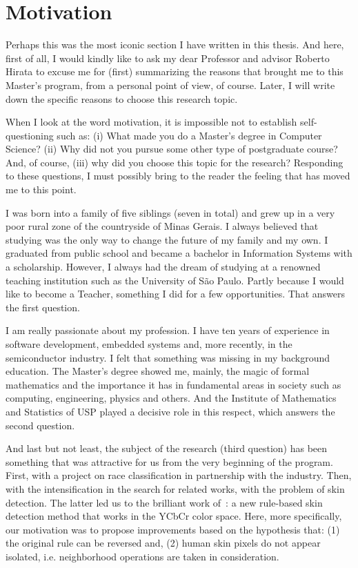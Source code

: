 \section{Motivation}
\label{sec:motivation}

Perhaps this was the most iconic section I have written in this thesis. And here, first of all, I would kindly like to ask my dear Professor and advisor Roberto Hirata to excuse me for (first) summarizing the reasons that brought me to this Master's program, from a personal point of view, of course. Later, I will write down the specific reasons to choose this research topic.

When I look at the word motivation, it is impossible not to establish self-questioning such as: (i) What made you do a Master's degree in Computer Science? (ii) Why did not you pursue some other type of postgraduate course? And, of course, (iii) why did you choose this topic for the research? Responding to these questions, I must possibly bring to the reader the feeling that has moved me to this point.

I was born into a family of five siblings (seven in total) and grew up in a very poor rural zone of the countryside of Minas Gerais. I always believed that studying was the only way to change the future of my family and my own. I graduated from public school and became a bachelor in Information Systems with a scholarship. However, I always had the dream of studying at a renowned teaching institution such as the University of São Paulo. Partly because I would like to become a Teacher, something I did for a few opportunities. That answers the first question.

I am really passionate about my profession. I have ten years of experience in software development, embedded systems and, more recently, in the semiconductor industry. I felt that something was missing in my background education. The Master's degree showed me, mainly, the magic of formal mathematics and the importance it has in fundamental areas in society such as computing, engineering, physics and others. And the Institute of Mathematics and Statistics of USP played a decisive role in this respect, which answers the second question.

And last but not least, the subject of the research (third question) has been something that was attractive for us from the very beginning of the program. First, with a project on race classification in partnership with the industry. Then, with the intensification in the search for related works, with the problem of skin detection. The latter led us to the brilliant work of~\citet{brancati:17}: a new rule-based skin detection method that works in the YCbCr color space. Here, more specifically, our motivation was to propose improvements based on the hypothesis that: (1) the original rule can be reversed and, (2) human skin pixels do not appear isolated, i.e. neighborhood operations are taken in consideration.


